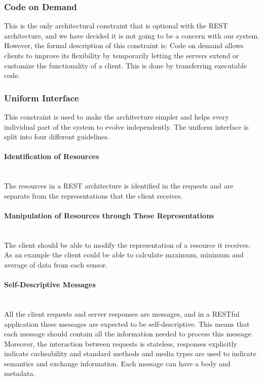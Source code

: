 \documentclass[../document.tex]{subfiles}
\begin{document}
\subsubsection{Code on Demand}
This is the only architectural constraint that is optional with the REST architecture, and we have decided it is not going to be a concern with our system. However, the formal description of this constraint is: Code on demand allows clients to improve its flexibility by temporarily letting the servers extend or customize the functionality of a client. This is done by transferring executable code.

\subsubsection{Uniform Interface}
This constraint is used to make the architecture simpler and helps every individual part of the system to evolve independently. The uniform interface is split into four different guidelines.

\paragraph{Identification of Resources} \ \\
The resources in a REST architecture is identified in the requests and are separate from the representations that the client receives. 

\paragraph{Manipulation of Resources through These Representations} \ \\
The client should be able to modify the representation of a resource it receives. As an example the client could be able to calculate maximum, minimum and average of data from each sensor. 

\paragraph{Self-Descriptive Messages} \ \\
All the client requests and server responses are messages, and in a RESTful application these messages are expected to be self-descriptive. This means that each message should contain all the information needed to process this message. Moreover, the interaction between requests is stateless, responses explicitly indicate cacheability and standard methods and media types are used to indicate semantics and exchange information. Each message can have a body and metadata.
\end{document}
